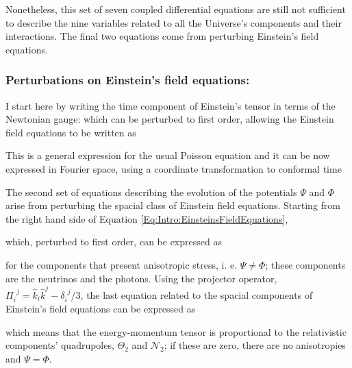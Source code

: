 \qquad Nonetheless, this set of seven coupled differential equations are still not sufficient to describe the nine variables related to all the Universe's components and their interactions. The final two equations come from perturbing Einstein's field equations.

\subsubsection{Perturbations on Einstein's field equations:}
I start here by writing the time component of Einstein's tensor in terms of the Newtonian gauge:
which can be perturbed to first order, allowing the Einstein field equations to be written as

This is a general expression for the usual Poisson equation and it can be now expressed in Fourier space, using a coordinate transformation to conformal time \citep{Peacock,dods}


\qquad The second set of equations describing the evolution of the potentials $\Psi$ and $\Phi$ arise from perturbing the spacial class of Einstein field equations. Starting from the right hand side of Equation \eqref{Eq:Intro:EinsteinsFieldEquations},

which, perturbed to first order, can be expressed as

for the components that present anisotropic stress, i. e. $\Psi \neq \Phi$; these components are the neutrinos and the photons. Using the projector operator, $\Pi_i^{\ \ j} = \hat{k}_i\hat{k}^j  - \delta_i^{\ \ j}/3$, the last equation related to the spacial components of Einstein's field equations can be expressed as \citep{dods}

which means that the energy-momentum tensor is proportional to the relativistic components' quadrupoles, $\Theta_2$ and $\mathcal{N}_2$; if these are zero, there are no anisotropies and $\Psi = \Phi$.

